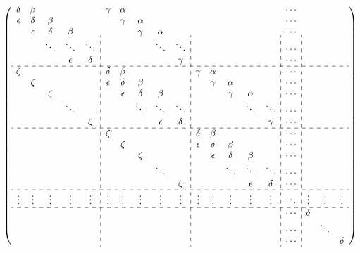 \begin{eqnarray}
    \pqty{\begin{array}{ccccc:ccccc:ccccc:c:ccc}
        \delta & \beta & & & & \gamma & \alpha & & & & & & & & & \cdots & & & \\
        \epsilon & \delta & \beta & & & & \gamma & \alpha & & & & & & & & \cdots & & & \\
        & \epsilon & \delta & \beta & & & & \gamma & \alpha & & & & & & & \cdots & & & \\
        & & \ddots & \ddots & \ddots & & & & \ddots & \ddots & & & & & & \cdots & & & \\ %
        & & & \epsilon & \delta & & & & & \gamma & & & & & & \cdots & & & \\
        \hdashline
        \zeta & & & & & \delta & \beta & & & & \gamma & \alpha & & & & \cdots & & & \\
        & \zeta & & & & \epsilon & \delta & \beta & & & & \gamma & \alpha & & & \cdots & & & \\
        & & \zeta & & & & \epsilon & \delta & \beta & & & & \gamma & \alpha & & \cdots & & & \\
        & & & \ddots & & & & \ddots & \ddots & \ddots & & & & \ddots & \ddots & \cdots & & & \\ %
        & & & & \zeta & & & & \epsilon & \delta & & & & & \gamma & \cdots & & & \\
        \hdashline
        & & & & & \zeta & & & & & \delta & \beta & & & & \cdots & & & \\
        & & & & & & \zeta & & & & \epsilon & \delta & \beta & & & \cdots & & & \\
        & & & & & & & \zeta & & & & \epsilon & \delta & \beta & & \cdots & & & \\
        & & & & & & & & \ddots & & & & \ddots & \ddots & \ddots & \cdots & & & \\
        & & & & & & & & & \zeta & & & & \epsilon & \delta & \cdots & & & \\
        \hdashline
        \vdots & \vdots & \vdots & \vdots & \vdots & \vdots & \vdots & \vdots & \vdots & \vdots & \vdots & \vdots & \vdots & \vdots & \vdots & \ddots & \vdots & \vdots & \vdots \\
        \hdashline
        & & & & & & & & & & & & & & & \cdots & \delta & & \\
        & & & & & & & & & & & & & & & \cdots & & \ddots & \\
        & & & & & & & & & & & & & & & \cdots & & & \delta \\

\end{array}}
\end{eqnarray}
